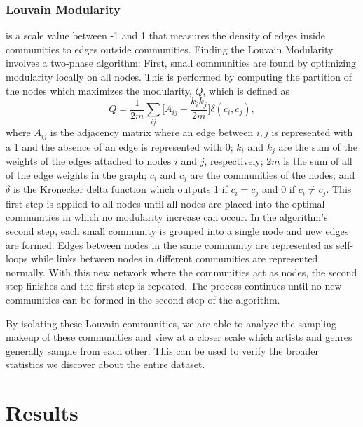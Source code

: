 \documentclass[pageno]{jpaper}
\begin{document}
\subsubsection{Louvain Modularity}
is a scale value between -1 and 1 that measures the density of edges inside communities to edges outside communities. Finding the Louvain Modularity involves a two-phase algorithm: First, small communities are found by optimizing modularity locally on all nodes. This is performed by computing the partition of the nodes which maximizes the modularity, $Q$, which is defined as
\begin{equation}
Q={\frac {1}{2m}}\sum \limits _{ij}{\bigg [}A_{ij}-{\frac {k_{i}k_{j}}{2m}}{\bigg ]}\delta (c_{i},c_{j}),
\end{equation} where $A_{ij}$ is the adjacency matrix where an edge between $i, j$ is represented with a 1 and the absence of an edge is represented with 0;
$k_{i}$ and $k_{j}$ are the sum of the weights of the edges attached to nodes $i$ and $j$, respectively;
$2m$ is the sum of all of the edge weights in the graph; 
$c_{i}$ and $c_{j}$ are the communities of the nodes;
and $\delta$ is the Kronecker delta function which outputs 1 if $c_i=c_j$ and 0 if $c_i\neq c_j$. This first step is applied to all nodes until all nodes are placed into the optimal communities in which no modularity increase can occur. In the algorithm's second step, each small community is grouped into a single node and new edges are formed. Edges between nodes in the same community are represented as self-loops while links between nodes in different communities are represented normally. With this new network where the communities act as nodes, the second step finishes and the first step is repeated. The process continues until no new communities can be formed in the second step of the algorithm.

By isolating these Louvain communities, we are able to analyze the sampling makeup of these communities and view at a closer scale which artists and genres generally sample from each other. This can be used to verify the broader statistics we discover about the entire dataset.  
\section{Results}
\end{document}
